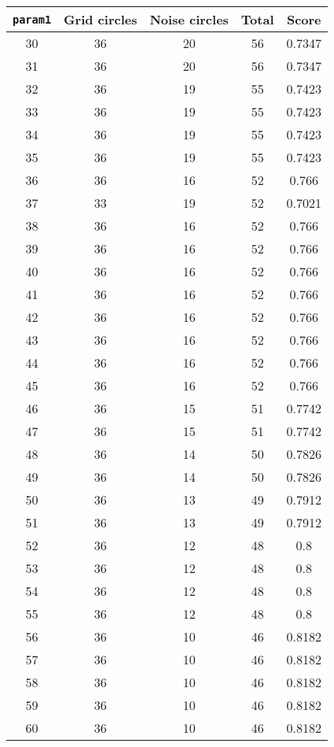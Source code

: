 \documentclass[letterpaper, 12pt]{article}
\begin{document}
\begin{longtable}{|c|c|c|c|c|}
\hline
\textbf{\texttt{param1}} & \textbf{Grid circles} & \textbf{Noise circles} & \textbf{Total} & \textbf{Score} \\
\hline
30 & 36 & 20 & 56 & 0.7347 \\
\hline
31 & 36 & 20 & 56 & 0.7347 \\
\hline
32 & 36 & 19 & 55 & 0.7423 \\
\hline
33 & 36 & 19 & 55 & 0.7423 \\
\hline
34 & 36 & 19 & 55 & 0.7423 \\
\hline
35 & 36 & 19 & 55 & 0.7423 \\
\hline
36 & 36 & 16 & 52 & 0.766 \\
\hline
37 & 33 & 19 & 52 & 0.7021 \\
\hline
38 & 36 & 16 & 52 & 0.766 \\
\hline
39 & 36 & 16 & 52 & 0.766 \\
\hline
40 & 36 & 16 & 52 & 0.766 \\
\hline
41 & 36 & 16 & 52 & 0.766 \\
\hline
42 & 36 & 16 & 52 & 0.766 \\
\hline
43 & 36 & 16 & 52 & 0.766 \\
\hline
44 & 36 & 16 & 52 & 0.766 \\
\hline
45 & 36 & 16 & 52 & 0.766 \\
\hline
46 & 36 & 15 & 51 & 0.7742 \\
\hline
47 & 36 & 15 & 51 & 0.7742 \\
\hline
48 & 36 & 14 & 50 & 0.7826 \\
\hline
49 & 36 & 14 & 50 & 0.7826 \\
\hline
50 & 36 & 13 & 49 & 0.7912 \\
\hline
51 & 36 & 13 & 49 & 0.7912 \\
\hline
52 & 36 & 12 & 48 & 0.8 \\
\hline
53 & 36 & 12 & 48 & 0.8 \\
\hline
54 & 36 & 12 & 48 & 0.8 \\
\hline
55 & 36 & 12 & 48 & 0.8 \\
\hline
56 & 36 & 10 & 46 & 0.8182 \\
\hline
57 & 36 & 10 & 46 & 0.8182 \\
\hline
58 & 36 & 10 & 46 & 0.8182 \\
\hline
59 & 36 & 10 & 46 & 0.8182 \\
\hline
60 & 36 & 10 & 46 & 0.8182 \\
\hline

\end{longtable}
\end{document}
